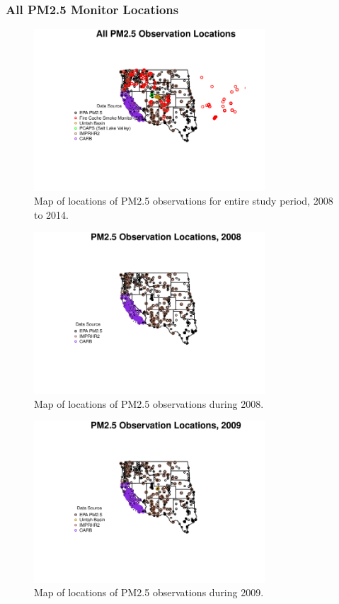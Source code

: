 
\subsubsection*{All PM2.5 Monitor Locations}
\begin{figure} 
\centering 
\includegraphics[width=0.77\textwidth]{Code_Outputs/MapPM25_All_Sitesplot_year0.pdf} 
\caption{\label{fig:MapPM25Loc0}Map of locations of PM2.5 observations for entire study period, 2008 to 2014.} 
\end{figure} 
 

\begin{figure} 
\centering 
\includegraphics[width=0.77\textwidth]{Code_Outputs/MapPM25_All_Sitesplot_year2008.pdf} 
\caption{\label{fig:MapPM25Loc2008}Map of locations of PM2.5 observations during 2008.} 
\end{figure} 
 

\begin{figure} 
\centering 
\includegraphics[width=0.77\textwidth]{Code_Outputs/MapPM25_All_Sitesplot_year2009.pdf} 
\caption{\label{fig:MapPM25Loc2009}Map of locations of PM2.5 observations during 2009.} 
\end{figure} 
 

